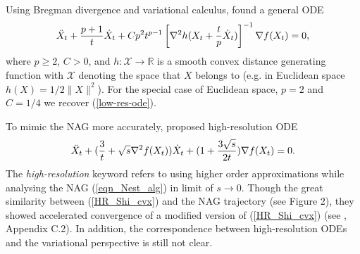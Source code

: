 \documentclass{article}
\theoremstyle{plain}
\theoremstyle{definition}
\theoremstyle{remark}
\begin{document}
Using Bregman divergence and variational calculus, \cite{WibisonoE7351} found a general ODE 
\begin{align}\label{general-low-res-ODE}
    \Ddot{X}_t+\frac{p+1}{t}\dot X_t+Cp^2t^{p-1}\left[\nabla^2 h(X_t+\frac{t}{p}\dot X_t)\right]^{-1}\nabla f(X_t)=0,
\end{align}
where $p\geq 2$, $C>0$, and $h:\mathcal{X}\rightarrow \mathbb{R}$ is a smooth convex distance generating function with $\mathcal{X}$ denoting the space that $X$ belongs to (e.g. in Euclidean space $h(X)=1/2\|X\|^2$). For the special case of Euclidean space, $p=2$ and $C=1/4$ we recover (\ref{low-res-ode}).\par
To mimic the NAG more accurately, \cite{Shi2021UnderstandingTA} proposed high-resolution ODE
\begin{align}\label{HR_Shi_cvx}
     \Ddot{X}_t + (\frac{3}{t}+\sqrt{s}\nabla^2 f(X_t))\dot{X}_t+(1+\frac{3\sqrt{s}}{2t})\nabla f(X_t)=0.
\end{align}
The \textit{high-resolution} keyword refers to using higher order approximations while analysing the NAG (\ref{eqn_Nest_alg}) in limit of $s\rightarrow 0$. Though the great similarity between (\ref{HR_Shi_cvx}) and the NAG trajectory (see \cite{Shi2021UnderstandingTA} Figure 2), they showed accelerated convergence of a modified version of (\ref{HR_Shi_cvx}) (see \cite{shi2019acceleration}, Appendix C.2). In addition, the correspondence between high-resolution ODEs and the variational perspective is still not clear.\par
\end{document}
